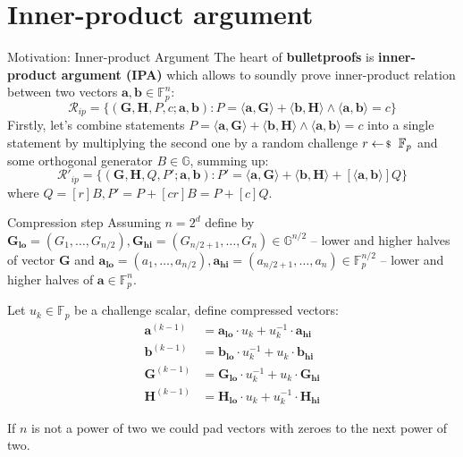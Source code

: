 \documentclass{zkdl-presentation-template}
\begin{document}
    \section{Inner-product argument}

    \begin{frame}{Motivation: Inner-product Argument}
        The heart of \textbf{bulletproofs} is \textbf{inner-product argument (IPA)} which allows to soundly prove inner-product relation between two vectors $\mathbf{a}, \mathbf{b} \in \mathbb{F}_p^n$:
        $$\mathcal{R}_{ip} = \{ (\mathbf{G,H}, P, c; \mathbf{a,b}) : P = \langle \mathbf{a,G} \rangle + \langle \mathbf{b,H} \rangle \wedge \langle \mathbf{a,b} \rangle = c \}$$
        \pause
        Firstly, let's combine statements $P = \langle \mathbf{a,G} \rangle + \langle \mathbf{b,H} \rangle \wedge \langle \mathbf{a,b} \rangle = c$ into a single statement by multiplying the second one by a random challenge $r \leftarrowS \mathbb{F}_p$ and some orthogonal generator $B \in \mathbb{G}$, summing up:
        $$
        \mathcal{R}'_{ip} = \{ (\mathbf{G,H}, Q, P'; \mathbf{a,b}) : P' = \langle \mathbf{a,G} \rangle + \langle \mathbf{b,H} \rangle + [\langle \mathbf{a,b} \rangle]Q \}
        $$
        where $Q=[r]B, P' = P + [cr]B = P+[c]Q$.
    \end{frame}

    \begin{frame}{Compression step}
        Assuming $n = 2^d$ define by $\mathbf{G_{lo}} = (G_1, \dots, G_{n/2}), \mathbf{G_{hi}} = (G_{n/2+1},\dots, G_n) \in \mathbb{G}^{n/2}$ -- lower and higher halves of vector $\mathbf{G}$ and $\mathbf{a_{lo}} = (a_1, \dots, a_{n/2}), \mathbf{a_{hi}} = (a_{n/2+1},\dots,a_n) \in \mathbb{F}_p^{n/2}$ -- lower and higher halves of $\mathbf{a} \in \mathbb{F}_p^{n}$.
        \pause

        Let $u_k \in \mathbb{F}_p$ be a challenge scalar, define compressed vectors:
        \begin{align*}
            \mathbf{a}^{(k-1)} &= \mathbf{a_{lo}} \cdot u_k + u_k^{-1} \cdot \mathbf{a_{hi}} \\
            \mathbf{b}^{(k-1)} &= \mathbf{b_{lo}} \cdot u_k^{-1} + u_k \cdot \mathbf{b_{hi}} \\
            \mathbf{G}^{(k-1)} &= \mathbf{G_{lo}} \cdot u_k^{-1} + u_k \cdot \mathbf{G_{hi}} \\
            \mathbf{H}^{(k-1)} &= \mathbf{H_{lo}} \cdot u_k + u_k^{-1} \cdot \mathbf{H_{hi}}
        \end{align*}
        \pause
        \vspace{-1em}
        \begin{remark}
            If $n$ is not a power of two we could pad vectors with zeroes to the next power of two.
        \end{remark}
    \end{frame}
\end{document}

